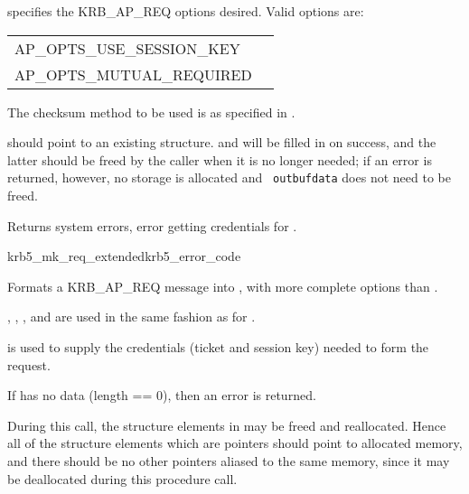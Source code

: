  specifies the KRB_AP_REQ options desired.
Valid options are:

\begin{tabular}{ll}
AP_OPTS_USE_SESSION_KEY&\\
AP_OPTS_MUTUAL_REQUIRED&\\
\end{tabular}
\label{ap-req-options}

The checksum method to be used is as specified in . 


 should point to an existing 
structure.   and
 will be filled in on success, and the latter
should be freed by the caller when it is no longer needed; if an error
is returned, however, no storage is allocated and {\tt
outbuf{\ptsto}data} does not need to be freed.

Returns system errors, error getting credentials for
.

\begin{funcdecl}{krb5_mk_req_extended}{krb5_error_code}{\funcinout}
\funcin
{}
\funcout
{}
\end{funcdecl}

Formats a KRB_AP_REQ message into , with more complete
options than .

, , ,
and  are used in the same fashion as for
.

 is used to supply the credentials (ticket and session
key) needed to form the request.

If  has no data (length == 0), then an
error is returned. 

During this call, the structure elements in  may be
freed and reallocated.  Hence all of the structure elements which are
pointers should point to allocated memory, and there should be no other
pointers aliased to the same memory, since it may be deallocated during
this procedure call.


